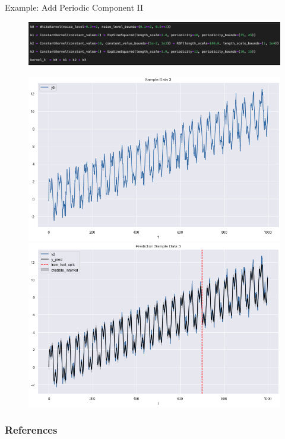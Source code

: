 \documentclass[10pt]{beamer}
\begin{document}
\begin{frame}{Example: Add Periodic Component II }
\begin{center}
\begin{figure}
\includegraphics[scale=0.3]{images/code_kernel_3_example3.png}
\end{figure}
\end{center}
\begin{center}
\begin{figure}
\includegraphics[scale=0.20]{images/sample_3_example3.png}
\includegraphics[scale=0.20]{images/pred_3_example3.png}
\end{figure}
\end{center}
\end{frame}


\begin{frame}[t, allowframebreaks]
\frametitle{References}
\footnotesize{

 
}
\end{frame}
\end{document}
